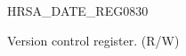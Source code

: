 \begin{register}{H}{RSA\_DATE\_REG}{\hexprefix{}0830}\label{regdesc:RSADATEREG}
%
%
\regnewline%
\begin{regdesc}\begin{reglist}
\item [RSA\_DATE] Version control register. (R/W)
\end{reglist}\end{regdesc}
\end{register}
